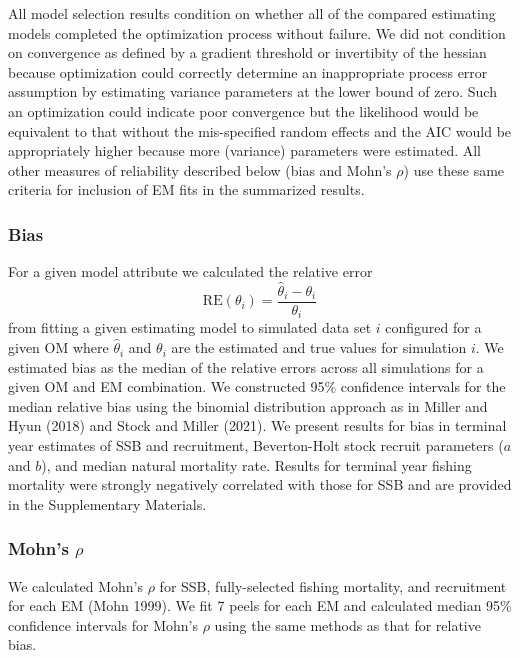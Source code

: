 \documentclass[
  12pt,
]{article}
\begin{document}
All model selection results condition on whether all of the compared
estimating models completed the optimization process without failure. We
did not condition on convergence as defined by a gradient threshold or
invertibity of the hessian because optimization could correctly
determine an inappropriate process error assumption by estimating
variance parameters at the lower bound of zero. Such an optimization
could indicate poor convergence but the likelihood would be equivalent
to that without the mis-specified random effects and the AIC would be
appropriately higher because more (variance) parameters were estimated.
All other measures of reliability described below (bias and Mohn's
\(\rho\)) use these same criteria for inclusion of EM fits in the
summarized results.

\hypertarget{bias}{%
\subsubsection*{Bias}\label{bias}}

For a given model attribute we calculated the relative error \[
\text{RE}\left(\theta_i\right) = \frac{\widehat \theta_i - \theta_i}{\theta_i}
\] from fitting a given estimating model to simulated data set \(i\)
configured for a given OM where \(\widehat \theta_i\) and \(\theta_i\)
are the estimated and true values for simulation \(i\). We estimated
bias as the median of the relative errors across all simulations for a
given OM and EM combination. We constructed 95\% confidence intervals
for the median relative bias using the binomial distribution approach as
in Miller and Hyun (2018) and Stock and Miller (2021). We present
results for bias in terminal year estimates of SSB and recruitment,
Beverton-Holt stock recruit parameters (\(a\) and \(b\)), and median
natural mortality rate. Results for terminal year fishing mortality were
strongly negatively correlated with those for SSB and are provided in
the Supplementary Materials.

\hypertarget{mohns-rho}{%
\subsubsection*{\texorpdfstring{Mohn's
\(\rho\)}{Mohn's \textbackslash rho}}\label{mohns-rho}}

We calculated Mohn's \(\rho\) for SSB, fully-selected fishing mortality,
and recruitment for each EM (Mohn 1999). We fit 7 peels for each EM and
calculated median 95\% confidence intervals for Mohn's \(\rho\) using
the same methods as that for relative bias.
\end{document}
